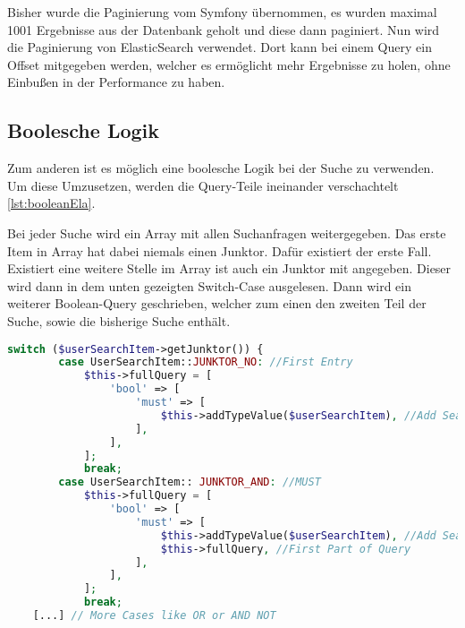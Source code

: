Bisher wurde die Paginierung vom Symfony übernommen, es wurden maximal 1001 Ergebnisse aus der Datenbank geholt und diese dann paginiert. Nun wird die Paginierung von ElasticSearch verwendet. Dort kann bei einem Query ein Offset mitgegeben werden, welcher es ermöglicht mehr Ergebnisse zu holen, ohne Einbußen in der Performance zu haben. 

\subsection{Boolesche Logik}

Zum anderen ist es möglich eine boolesche Logik bei der Suche zu verwenden. Um diese Umzusetzen, werden die Query-Teile ineinander verschachtelt \ref{lst:booleanEla}. 

Bei jeder Suche wird ein Array mit allen Suchanfragen weitergegeben. Das erste Item in Array hat dabei niemals einen Junktor. Dafür existiert der erste Fall. Existiert eine weitere Stelle im Array ist auch ein Junktor mit angegeben. Dieser wird dann in dem unten gezeigten Switch-Case ausgelesen. Dann wird ein weiterer Boolean-Query geschrieben, welcher zum einen den zweiten Teil der Suche, sowie die bisherige Suche enthält.

\begin{lstlisting}[language=PHP, frame=single, label={lst:booleanEla}] 
    switch ($userSearchItem->getJunktor()) {
        case UserSearchItem::JUNKTOR_NO: //First Entry
            $this->fullQuery = [
                'bool' => [
                    'must' => [
                        $this->addTypeValue($userSearchItem), //Add Search
                    ],
                ],
            ];
            break;
        case UserSearchItem:: JUNKTOR_AND: //MUST
            $this->fullQuery = [
                'bool' => [
                    'must' => [
                        $this->addTypeValue($userSearchItem), //Add Search
                        $this->fullQuery, //First Part of Query
                    ],
                ],
            ];
            break;
    [...] // More Cases like OR or AND NOT
\end{lstlisting}